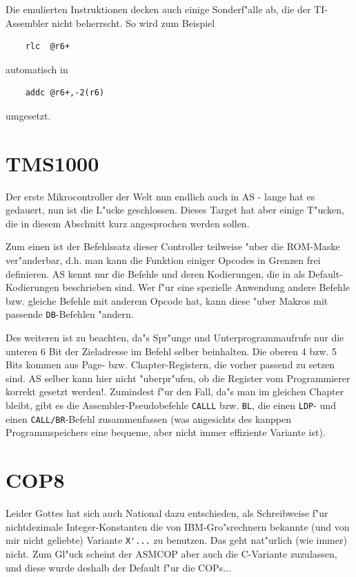 \documentclass[12pt,a4paper,twoside]{report}
\newcommand{\tty}[1]{{\tt #1}}
\newcommand{\asname}{AS}
\begin{document}
Die emulierten Instruktionen decken auch einige Sonderf"alle ab,
die der TI-Assembler nicht beherrscht.  So wird zum Beispiel
\begin{verbatim}
    rlc  @r6+
\end{verbatim}
automatisch in
\begin{verbatim}
    addc @r6+,-2(r6)
\end{verbatim}
umgesetzt.


\section{TMS1000}

Der erste Mikrocontroller der Welt nun endlich auch in \asname{} - lange hat es
gedauert, nun ist die L"ucke geschlossen.  Dieses Target hat aber einige
T"ucken, die in diesem Abschnitt kurz angesprochen werden sollen.

Zum einen ist der Befehlssatz dieser Controller teilweise "uber die ROM-Maske
ver"anderbar, d.h. man kann die Funktion einiger Opcodes in Grenzen frei
definieren.  \asname{} kennt nur die Befehle und deren Kodierungen, die in
\cite{TMS1000PGMRef} als Default-Kodierungen beschrieben sind.  Wer f"ur eine
spezielle Anwendung andere Befehle bzw. gleiche Befehle mit anderem Opcode
hat, kann diese "uber Makros mit passende \tty{DB}-Befehlen "andern.

Des weiteren ist zu beachten, da"s Spr"unge und Unterprogrammaufrufe nur die
unteren 6 Bit der Zieladresse im Befehl selber beinhalten.  Die oberen 4 bzw.
5 Bits kommen aus Page- bzw. Chapter-Registern, die vorher passend zu setzen
sind.  \asname{} selber kann hier nicht "uberpr"ufen, ob die Register vom Programmierer
korrekt gesetzt werden!.  Zumindest f"ur den Fall, da"s man im gleichen Chapter
bleibt, gibt es die Assembler-Pseudobefehle \tty{CALLL} bzw.
\tty{BL}, die einen \tty{LDP}- und einen \tty{CALL/BR}-Befehl zusammenfassen
(was angesichts des kanppen Programmspeichers eine bequeme, aber nicht immer
effiziente Variante ist).


\section{COP8}
\label{COP8Spec}

Leider Gottes hat sich auch National dazu entschieden, als
Schreibweise f"ur nichtdezimale Integer-Konstanten die von
IBM-Gro"srechnern bekannte (und von mir nicht geliebte) Variante
\verb!X'...! zu benutzen.  Das geht nat"urlich (wie immer) nicht.
Zum Gl"uck scheint der ASMCOP aber auch die C-Variante zuzulassen,
und diese wurde deshalb der Default f"ur die COPs...
\end{document}
